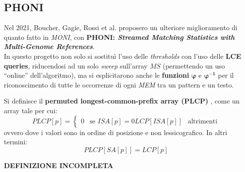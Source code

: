 \subsection{PHONI}
Nel 2021, Boucher, Gagie, Rossi et al. proposero un ulteriore miglioramento di
quanto fatto in \textit{MONI}, con \textbf{PHONI: \textit{Streamed Matching
    Statistics with Multi-Genome References}}.\\
In questo progetto non solo si sostituì l'uso delle \textit{thresholds} con
l'uso delle \textbf{LCE queries}, riducendosi ad un solo \textit{sweep}
sull'array $MS$ (permettendo un uso ``online'' dell'algoritmo), ma si
esplicitarono anche le \textbf{funzioni} $\mathbf{\varphi}$ e
$\mathbf{\varphi^{-1}}$ per il riconoscimento di tutte le occorrenze di ogni
\textit{MEM} tra un pattern e un testo.%
\begin{definizione}
  Si definisce il \textbf{permuted longest-common-prefix array (PLCP)}
  \cite{plcp}, come un array tale per cui:
  \[PLCP[p]=
    \begin{cases}
      0&\mbox{se }ISA[p]=0
      LCP[ISA[p]]&\mbox{altrimenti}
    \end{cases}
  \]
  ovvero dove i valori sono in ordine di posizione e non lessicografico. In
  altri termini:
  \[PLCP[SA[p]] = LCP[p]\]
\end{definizione}
\textbf{DEFINIZIONE INCOMPLETA}